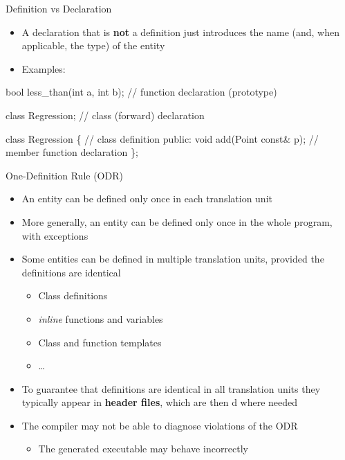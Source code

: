 \begin{frame}[fragile]{Definition vs Declaration \insertcontinuationtext}

  \begin{itemize}
  \item A \alert{declaration} that is \textbf{not} a definition just introduces
    the name (and, when applicable, the type) of the entity
  \item Examples:
  \end{itemize}

  \begin{codeblock}{
bool less_than(int a, int b); // function declaration (prototype)

class Regression; // class (forward) declaration

class Regression \{ // class definition
  \ddd
  public:
  void add(Point const& p); // member function declaration
  \ddd
\};
}\end{codeblock}

\end{frame}

\begin{frame}{One-Definition Rule (ODR)}
  \begin{itemize}[<+->]
  \item An entity can be defined only once in each translation unit
  \item More generally, an entity can be defined only once in the whole program,
    with exceptions
  \item Some entities can be defined in multiple translation units, provided the
    definitions are identical
    \begin{itemize}[<.->]
    \item Class definitions
    \item \textit{inline} functions and variables
    \item Class and function templates
    \item \ldots
    \end{itemize}
  \item To guarantee that definitions are identical in all translation units
    they typically appear in \textbf{header files}, which are then
    d where needed
  \item The compiler may not be able to diagnose violations of the ODR
    \begin{itemize}[<.->]
    \item The generated executable may behave incorrectly
    \end{itemize}
  \end{itemize}
\end{frame}

